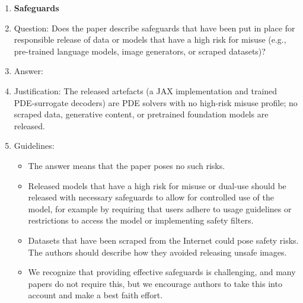 \begin{enumerate}
\item {\bf Safeguards}
    \item[] Question: Does the paper describe safeguards that have been put in place for responsible release of data or models that have a high risk for misuse (e.g., pre-trained language models, image generators, or scraped datasets)?
    \item[] Answer: \answerNA{}
    \item[] Justification: The released artefacts (a JAX implementation and trained PDE-surrogate decoders) are PDE solvers with no high-risk misuse profile; no scraped data, generative content, or pretrained foundation models are released.
    \item[] Guidelines:
    \begin{itemize}
        \item The answer \answerNA{} means that the paper poses no such risks.
        \item Released models that have a high risk for misuse or dual-use should be released with necessary safeguards to allow for controlled use of the model, for example by requiring that users adhere to usage guidelines or restrictions to access the model or implementing safety filters. 
        \item Datasets that have been scraped from the Internet could pose safety risks. The authors should describe how they avoided releasing unsafe images.
        \item We recognize that providing effective safeguards is challenging, and many papers do not require this, but we encourage authors to take this into account and make a best faith effort.
    \end{itemize}


\end{enumerate}
